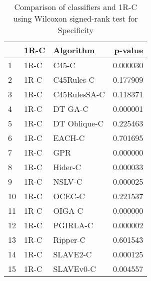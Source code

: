 \begin{table}
\footnotesize
\caption{Comparison of classifiers and 1R-C using Wilcoxon signed-rank test for Specificity}
\label{tab:1R-C wilcoxon Specificity comparison}
\begin{tabular}{lllr}
\hline
 & 1R-C & Algorithm & p-value \\
\hline
1 & 1R-C & C45-C & 0.000030 \\
2 & 1R-C & C45Rules-C & 0.177909 \\
3 & 1R-C & C45RulesSA-C & 0.118371 \\
4 & 1R-C & DT GA-C & 0.000001 \\
5 & 1R-C & DT Oblique-C & 0.225463 \\
6 & 1R-C & EACH-C & 0.701695 \\
7 & 1R-C & GPR & 0.000000 \\
8 & 1R-C & Hider-C & 0.000033 \\
9 & 1R-C & NSLV-C & 0.000025 \\
10 & 1R-C & OCEC-C & 0.221537 \\
11 & 1R-C & OIGA-C & 0.000000 \\
12 & 1R-C & PGIRLA-C & 0.000002 \\
13 & 1R-C & Ripper-C & 0.601543 \\
14 & 1R-C & SLAVE2-C & 0.000125 \\
15 & 1R-C & SLAVEv0-C & 0.004557 \\
\hline
\end{tabular}
\end{table}
